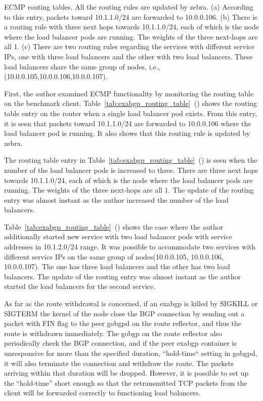 {\begin{table}[h]
  \par\bigskip
  \centering
  \begin{minipage}{0.9\columnwidth}
    \caption[ECMP routing tables]{
ECMP routing tables. All the routing rules are updated by zebra.
(a) According to this entry, packets toward 10.1.1.0/24 are forwarded to 10.0.0.106.
(b) There is a routing rule with three next hops towards 10.1.1.0/24, each of which is the node where the load balancer pods are running.
The weights of the three next-hops are all 1.
(c) There are two routing rules regarding the services with different service IPs, one with three load balancers and the other with two load balancers.
These load balancers share the same group of nodes, i.e., (10.0.0.105,10.0.0.106,10.0.0.107).
    }
    \label{tab:exabgp_routing_table}
  \end{minipage}
\end{table}
}

First, the author examined ECMP functionality by monitoring the routing table on the benchmark client.
Table~\ref{tab:exabgp_routing_table}~() shows the routing table entry on the router when a single load balancer pod exists.
From this entry, it is seen that packets toward 10.1.1.0/24 are forwarded to 10.0.0.106 where the load balancer pod is running.
It also shows that this routing rule is updated by zebra.

The routing table entry in Table~\ref{tab:exabgp_routing_table}~() is seen when the number of the load balancer pods is increased to three.
There are three next hops towards 10.1.1.0/24, each of which is the node where the load balancer pods are running.
The weights of the three next-hops are all 1.
The update of the routing entry was almost instant as the author increased the number of the load balancers.

Table~\ref{tab:exabgp_routing_table}~() shows the case where the author additionally started new service with two load balancer pods with service addresses in 10.1.2.0/24 range.
It was possible to accommodate two services with different service IPs on the same group of nodes(10.0.0.105, 10.0.0.106, 10.0.0.107). 
The one has three load balancers and the other has two load balancers.
The update of the routing entry was almost instant as the author started the load balancers for the second service.

As far as the route withdrawal is concerned, if an exabgp is killed by SIGKILL or SIGTERM the kernel of the node close the BGP connection by sending out a packet with FIN flag to the peer gobgpd on the route reflector, and thus the route is withdrawn immediately.
The gobgp on the route reflector also periodically check the BGP connection, and if the peer exabgp container is unresponsive for more than the specified duration, “hold-time“ setting in gobgpd, it will also terminate the connection and withdraw the route.
The packets arriving within that duration will be dropped.
However, it is possible to set up the “hold-time” short enough so that the retransmitted TCP packets from the client will be forwarded correctly to functioning load balancers.

